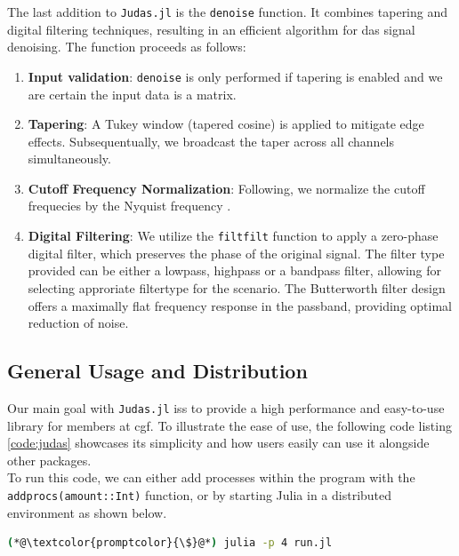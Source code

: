 

The last addition to \texttt{Judas.jl} is the \texttt{denoise} function. It combines tapering and digital filtering techniques, resulting in an efficient algorithm for \acrshort{das} signal denoising. The function proceeds as follows:

\begin{enumerate}
    \item \textbf{Input validation}: \texttt{denoise} is only performed if tapering is enabled and we are certain the input data is a matrix.
    \item \textbf{Tapering}: A Tukey window (tapered cosine) is applied to mitigate edge effects. Subsequentually, we broadcast the taper across all channels simultaneously.
    \item \textbf{Cutoff Frequency Normalization}: Following, we   normalize the cutoff frequecies by the Nyquist frequency \cite{schmogrow2012nyquist}.
    \item \textbf{Digital Filtering}: We utilize the  \texttt{filtfilt} function to apply a zero-phase digital filter, which preserves the phase of the original signal. The filter type provided can be either a lowpass, highpass or a bandpass filter, allowing for selecting approriate filtertype for the scenario. The Butterworth filter design offers a maximally flat frequency response in the passband, providing optimal reduction of noise.
\end{enumerate}

\subsection{General Usage and Distribution}

Our main goal with \texttt{Judas.jl} iss to provide a high performance and easy-to-use library for members at \acrshort{cgf}. To illustrate the ease of use, the following code listing \ref{code:judas} showcases its simplicity and how users easily can use it alongside other packages. \\



To run this code, we can either add processes within the program with the \texttt{addprocs(amount::Int)} function, or by starting Julia in a distributed environment as shown below.

\begin{lstlisting}[style=shellcommand, language=bash, caption=How to run a simple script containing Judas snippets]
(*@\textcolor{promptcolor}{\$}@*) julia -p 4 run.jl
\end{lstlisting}

